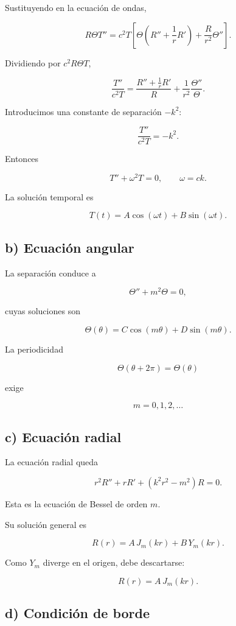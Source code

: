 \documentclass[11pt,spanish]{article}
\begin{document}
Sustituyendo en la ecuación de ondas,

\[
R\Theta T''
=
c^2T
\left[
\Theta
\left(
R''+\frac{1}{r}R'
\right)
+
\frac{R}{r^2}\Theta''
\right].
\]

Dividiendo por $c^2R\Theta T$,

\[
\frac{T''}{c^2T}
=
\frac{R''+\frac{1}{r}R'}{R}
+
\frac{1}{r^2}
\frac{\Theta''}{\Theta}.
\]

Introducimos una constante de separación $-k^2$:

\[
\frac{T''}{c^2T}=-k^2.
\]

Entonces

\[
T''+\omega^2T=0,
\qquad
\omega=ck.
\]

La solución temporal es

\[
T(t)
=
A\cos(\omega t)
+
B\sin(\omega t).
\]

\subsection*{b) Ecuación angular}

La separación conduce a

\[
\Theta''+m^2\Theta=0,
\]

cuyas soluciones son

\[
\Theta(\theta)
=
C\cos(m\theta)
+
D\sin(m\theta).
\]

La periodicidad

\[
\Theta(\theta+2\pi)=\Theta(\theta)
\]

exige

\[
m=0,1,2,\ldots
\]

\subsection*{c) Ecuación radial}

La ecuación radial queda

\[
r^2R''
+
rR'
+
(k^2r^2-m^2)R
=
0.
\]

Esta es la ecuación de Bessel de orden $m$.

Su solución general es

\[
R(r)
=
A\,J_m(kr)
+
B\,Y_m(kr).
\]

Como $Y_m$ diverge en el origen, debe descartarse:

\[
R(r)
=
A\,J_m(kr).
\]

\subsection*{d) Condición de borde}
\end{document}
